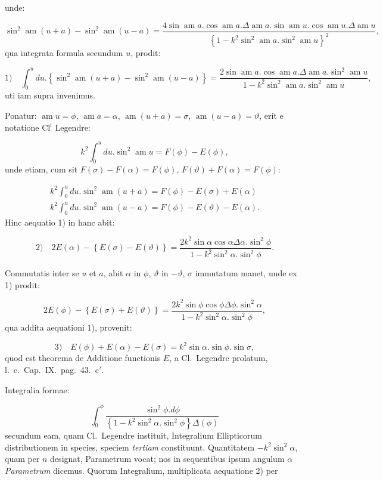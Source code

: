\documentclass{article}
\begin{document}
unde:

\[
\sin^{2}\operatorname{am}(u+a)-\sin^{2}\operatorname{am}(u-a)=\frac{4\sin\operatorname{am}a.\cos\operatorname{am}a.\Delta\operatorname{am}a.\sin\operatorname{am}u.\cos\operatorname{am}u.\Delta\operatorname{am}u}{\left\{1-k^{2}\sin^{2}\operatorname{am}a.\sin^{2}\operatorname{am}u\right\}^{2}},
\]
qua integrata formula secundum $u$, prodit:

\[
\text{1)}\quad\int_{0}^{u}du.\left\{\sin^{2}\operatorname{am}(u+a)-\sin^{2}\operatorname{am}(u-a)\right\}=\frac{2\sin\operatorname{am}a.\cos\operatorname{am}a.\Delta\operatorname{am}a.\sin^{2}\operatorname{am}u}{1-k^{2}\sin^{2}\operatorname{am}a.\sin^{2}\operatorname{am}u},
\]
uti iam supra invenimus.

Ponatur: $\operatorname{am}u=\phi$, $\operatorname{am}a=\alpha$, $\operatorname{am}(u+a)=\sigma$, $\operatorname{am}(u-a)=\vartheta$, erit e notatione Cl$^{\mathrm{i}}$ Legendre:

\[
k^{2}\int_{0}^{u}du.\sin^{2}\operatorname{am}u=F(\phi)-E(\phi),
\]
unde etiam, cum sit $F(\sigma)-F(\alpha)=F(\phi)$, $F(\vartheta)+F(\alpha)=F(\phi)$:

\[
\begin{gathered}
k^{2}\int_{0}^{u}du.\sin^{2}\operatorname{am}(u+a)=F(\phi)-E(\sigma)+E(\alpha)\\[1.5ex]
k^{2}\int_{0}^{u}du.\sin^{2}\operatorname{am}(u-a)=F(\phi)-E(\vartheta)-E(\alpha).
\end{gathered}
\]
Hinc aequatio 1) in hanc abit:

\[
\text{2)}\quad2E(\alpha)-\left\{E(\sigma)-E(\vartheta)\right\}=\frac{2k^{2}\sin\alpha\cos\alpha\Delta\alpha.\sin^{2}\phi}{1-k^{2}\sin^{2}\alpha.\sin^{2}\phi}.
\]

Commutatis inter se $u$ et $a$, abit $\alpha$ in $\phi$, $\vartheta$ in $-\vartheta$, $\sigma$ immutatum manet, unde ex 1) prodit:

\[
2E(\phi)-\left\{E(\sigma)+E(\vartheta)\right\}=\frac{2k^{2}\sin\phi\cos\phi\Delta\phi.\sin^{2}\alpha}{1-k^{2}\sin^{2}\alpha.\sin^{2}\phi},
\]
qua addita aequationi 1), provenit:

\[
\text{3)}\quad E(\phi)+E(\alpha)-E(\sigma)=k^{2}\sin\alpha.\sin\phi.\sin\sigma,
\]
quod est theorema de Additione functionis $E$, a Cl.\ Legendre prolatum, l.\ c.\ Cap.\ IX.\ pag.\ 43.\ c$'$.

Integralia formae:

\[
\int_{0}^{\phi}\frac{\sin^{2}\phi.d\phi}{\left\{1-k^{2}\sin^{2}\alpha.\sin^{2}\phi\right\}\Delta(\phi)}
\]
secundum eam, quam Cl.\ Legendre instituit, Integralium Ellipticorum distributionem in species, speciem \emph{tertiam} constituunt. Quantitatem $-k^{2}\sin^{2}\alpha$, quam per $n$ designat, Parametrum vocat; nos in sequentibus ipsum angulum $\alpha$ \emph{Parametrum} dicemus. Quorum Integralium, multiplicata aequatione 2) per
\end{document}
